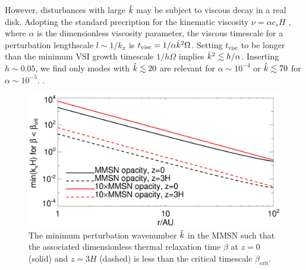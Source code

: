 {%

However, disturbances with large $\hat{k}$ may be subject to viscous
decay in a real disk. Adopting the standard precription for the
kinematic viscosity $\nu = \alpha c_s H$ \citep{shakura73}, where
$\alpha$ is the dimensionless viscosity parameter, 
the viscous timescale for a perturbation lengthscale 
$l\sim 1/k_x$ is $t_\mathrm{visc} = 1/\alpha\hat{k}^2\Omega $. 
Setting $t_\mathrm{visc}$ to be longer than the
minimum VSI growth timescale $1/h\Omega$ implies 
$\hat{k}^2\lesssim h/\alpha$. Inserting $h \sim 0.05$,
we find only modes with $\hat{k}\lesssim 20$ are relevant for
$\alpha\sim 10^{-4}$ or $\hat{k}\lesssim 70$ for $\alpha\sim
10^{-5}$. .


\begin{figure}
  \includegraphics[width=\linewidth]{figures/bcrit_mink} 
  \caption{The minimum perturbation wavenumber $\hat{k}$ in
    the MMSN such that the associated dimensionless thermal
    relaxation time $\beta$ at $z=0$ (solid) and $z=3H$ (dashed) is
    less than the critical timescale $\beta_\mathrm{crit}$.   
    \label{mmsn_bcrit_bcool_mink}}   
\end{figure}  

}
